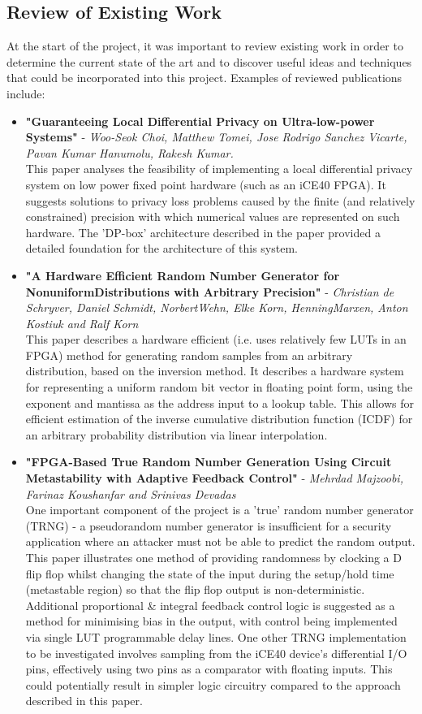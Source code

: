 \documentclass[pageno]{jpaper}
\begin{document}
\subsection{Review of Existing Work}
At the start of the project, it was important to review existing work in order to determine the current state of the art and to discover useful ideas and techniques that could be incorporated into this project. Examples of reviewed publications include:
\begin{itemize}
\item \textbf{"Guaranteeing Local Differential Privacy
on Ultra-low-power Systems"} - \textit{Woo-Seok Choi, Matthew Tomei, Jose Rodrigo Sanchez Vicarte, Pavan Kumar Hanumolu, Rakesh Kumar.}\cite{Choi2018GuaranteeingLD}\\
This paper analyses the feasibility of implementing a local differential privacy system on low power fixed point hardware (such as an iCE40 FPGA). It suggests solutions to privacy loss problems caused by the finite (and relatively constrained) precision with which numerical values are represented on such hardware. The 'DP-box' architecture described in the paper provided a detailed foundation for the architecture of this system.
\item \textbf{"A Hardware Efficient Random Number Generator for
NonuniformDistributions with Arbitrary Precision"} - \textit{Christian de Schryver, Daniel Schmidt, NorbertWehn, Elke Korn,
HenningMarxen, Anton Kostiuk and Ralf Korn}\cite{DeSchryver}\\
This paper describes a hardware efficient (i.e. uses relatively few LUTs in an FPGA) method for generating random samples from an arbitrary distribution, based on the inversion method. It describes a hardware system for representing a uniform random bit vector in floating point form, using the exponent and mantissa as the address input to a lookup table. This allows for efficient estimation of the inverse cumulative distribution function (ICDF) for an arbitrary probability distribution via linear interpolation.
\item \textbf{"FPGA-Based True Random Number Generation Using Circuit Metastability with Adaptive Feedback Control"} - \textit{Mehrdad Majzoobi, Farinaz Koushanfar
and Srinivas Devadas}\cite{trng}\\
One important component of the project is a 'true' random number generator (TRNG) - a pseudorandom number generator is insufficient for a security application where an attacker must not be able to predict the random output. This paper illustrates one method of providing randomness by clocking a D flip flop whilst changing the state of the input during the setup/hold time (metastable region) so that the flip flop output is non-deterministic. Additional proportional \& integral feedback control logic is suggested as a method for minimising bias in the output, with control being implemented via single LUT programmable delay lines. One other TRNG implementation to be investigated involves sampling from the iCE40 device's differential I/O pins, effectively using two pins as a comparator with floating inputs. This could potentially result in simpler logic circuitry compared to the approach described in this paper.
\end{itemize}
\end{document}
